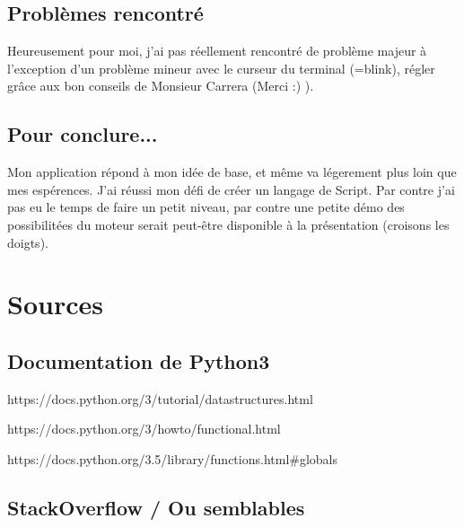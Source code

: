 \documentclass{report}
\begin{document}
\section{Problèmes rencontré}
Heureusement pour moi, j'ai pas réellement rencontré de problème majeur à l'exception d'un problème mineur avec le curseur du terminal (=blink), régler grâce aux bon conseils de Monsieur Carrera (Merci :) ).

\section{Pour conclure...}
Mon application répond à mon idée de base, et même va légerement plus loin que mes espérences. J'ai réussi mon défi de créer un langage de Script. Par contre j'ai pas eu le temps de faire un petit niveau, par contre une petite démo des possibilitées du moteur serait peut-être disponible à la présentation (croisons les doigts).

\chapter{Sources}
\section*{Documentation de Python3}
\par https://docs.python.org/3/tutorial/datastructures.html
\newline\par https://docs.python.org/3/howto/functional.html
\newline\par https://docs.python.org/3.5/library/functions.html\#globals

\section*{StackOverflow / Ou semblables}
\end{document}
